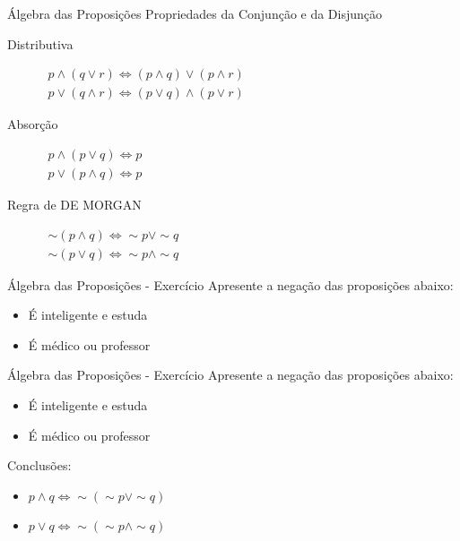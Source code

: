 \begin{frame}[t]{Álgebra das Proposições}
	Propriedades da Conjunção e da Disjunção

	\vskip 0.7cm

	\begin{description}
	\item [Distributiva] $\begin{array}{l}p \wedge (q \vee r) \Leftrightarrow (p \wedge q)\vee(p \wedge r)\\p \vee (q \wedge r) \Leftrightarrow (p \vee q) \wedge (p \vee r)\end{array}$

	\item [Absorção] $\begin{array}{l}p \wedge (p \vee q) \Leftrightarrow p\\p \vee (p \wedge q) \Leftrightarrow p\end{array}$

	\item [Regra de DE MORGAN] $\begin{array}{l}\sim(p \wedge q) \Leftrightarrow \sim p \vee \sim q\\ \sim (p \vee q) \Leftrightarrow \sim p \wedge \sim q\end{array}$
	\end{description}
\end{frame}

\begin{frame}[t]{Álgebra das Proposições - Exercício}
	Apresente a negação das proposições abaixo:

	\begin{itemize}
	\item É inteligente e estuda
	\item É médico ou professor
	\end{itemize}
\end{frame}

\begin{frame}[t]{Álgebra das Proposições - Exercício}
	Apresente a negação das proposições abaixo:

	\begin{itemize}
	\item É inteligente e estuda
	\item É médico ou professor
	\end{itemize}

	\vskip 0.5cm

	Conclusões:

	\begin{itemize}
	\item $p \wedge q \Leftrightarrow \sim(\sim p \vee \sim q)$
	\item $p \vee q \Leftrightarrow \sim(\sim p \wedge \sim q)$
	\end{itemize}
\end{frame}

